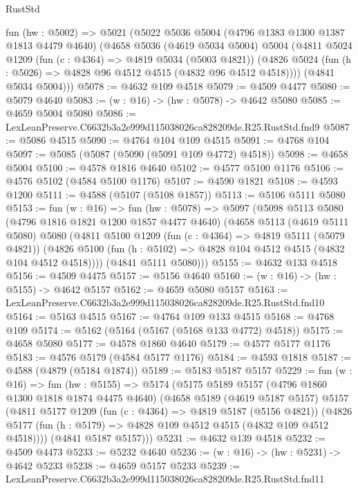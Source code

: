 \begin{lexlean}{RustStd}
\begin{coremodule}
  fun (hw : @5002) =>
  @5021
    (@5022
      @5036
      @5004
      (@4796 @1383 @1300 @1387 @1813 @4479 @4640)
      (@4658
        @5036
        (@4619 @5034 @5004)
        @5004
        (@4811
          @5024
          @1209
          (fun (c : @4364) => @4819 @5034 (@5003 @4821))
          (@4826 @5024 (fun (h : @5026) => @4828 @96 @4512 @4515 (@4832 @96 @4512 @4518))))
        (@4841 @5034 @5004)))
@5078 := @4632 @109 @4518
@5079 := @4509 @4477
@5080 := @5079 @4640
@5083 := (w : @16) -> (hw : @5078) -> @4642 @5080
@5085 := @4659 @5004 @5080
@5086 := LexLeanPreserve.C6632b3a2e999d115038026ca828209de.R25.RustStd.fnd9
@5087 := @5086 @4515
@5090 := @4764 @104 @109 @4515
@5091 := @4768 @104
@5097 := @5085 (@5087 (@5090 (@5091 @109 @4772) @4518))
@5098 := @4658 @5004
@5100 := @4578 @1816 @4640
@5102 := @4577 @5100 @1176
@5106 := @4576 @5102 (@4584 @5100 @1176)
@5107 := @4590 @1821
@5108 := @4593 @1200
@5111 := @4588 (@5107 (@5108 @1857))
@5113 := @5106 @5111 @5080
@5153 := fun (w : @16) =>
  fun (hw : @5078) =>
  @5097
    (@5098
      @5113
      @5080
      (@4796 @1816 @1821 @1200 @1857 @4477 @4640)
      (@4658
        @5113
        (@4619 @5111 @5080)
        @5080
        (@4811
          @5100
          @1209
          (fun (c : @4364) => @4819 @5111 (@5079 @4821))
          (@4826 @5100 (fun (h : @5102) => @4828 @104 @4512 @4515 (@4832 @104 @4512 @4518))))
        (@4841 @5111 @5080)))
@5155 := @4632 @133 @4518
@5156 := @4509 @4475
@5157 := @5156 @4640
@5160 := (w : @16) -> (hw : @5155) -> @4642 @5157
@5162 := @4659 @5080 @5157
@5163 := LexLeanPreserve.C6632b3a2e999d115038026ca828209de.R25.RustStd.fnd10
@5164 := @5163 @4515
@5167 := @4764 @109 @133 @4515
@5168 := @4768 @109
@5174 := @5162 (@5164 (@5167 (@5168 @133 @4772) @4518))
@5175 := @4658 @5080
@5177 := @4578 @1860 @4640
@5179 := @4577 @5177 @1176
@5183 := @4576 @5179 (@4584 @5177 @1176)
@5184 := @4593 @1818
@5187 := @4588 (@4879 (@5184 @1874))
@5189 := @5183 @5187 @5157
@5229 := fun (w : @16) =>
  fun (hw : @5155) =>
  @5174
    (@5175
      @5189
      @5157
      (@4796 @1860 @1300 @1818 @1874 @4475 @4640)
      (@4658
        @5189
        (@4619 @5187 @5157)
        @5157
        (@4811
          @5177
          @1209
          (fun (c : @4364) => @4819 @5187 (@5156 @4821))
          (@4826 @5177 (fun (h : @5179) => @4828 @109 @4512 @4515 (@4832 @109 @4512 @4518))))
        (@4841 @5187 @5157)))
@5231 := @4632 @139 @4518
@5232 := @4509 @4473
@5233 := @5232 @4640
@5236 := (w : @16) -> (hw : @5231) -> @4642 @5233
@5238 := @4659 @5157 @5233
@5239 := LexLeanPreserve.C6632b3a2e999d115038026ca828209de.R25.RustStd.fnd11

\end{coremodule}
\end{lexlean}
